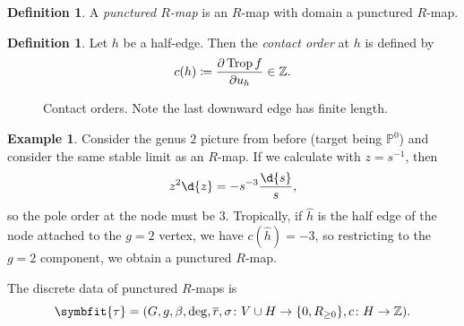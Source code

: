 \documentclass[10pt,oldfontcommands,oneside]{memoir}
\theoremstyle{definition}
\newtheorem{defn}[thm]{Definition}
\newtheorem{exm}[thm]{Example}
\theoremstyle{remark}
\theoremstyle{plain}
\theoremstyle{definition}
\theoremstyle{remark}
\newcommand{\R}{\mathbb{R}}
\newcommand{\Z}{\mathbb{Z}}
\renewcommand{\P}{\mathbb{P}}
\newcommand{\on}[1]{\operatorname{#1}}
\newcommand{\ol}[1]{\overline{#1}}
\newcommand{\1}{\mathbf{1}}
\newcommand{\2}{\mathbf{2}}
\newcommand{\3}{\mathbf{3}}
\begin{document}
\begin{defn}
    A \textit{punctured $R$-map} is an $R$-map with domain a punctured $R$-map.
\end{defn}

\begin{defn}
    Let $h$ be a half-edge. Then the \textit{contact order} at $h$ is defined by
    \[ c(h) \coloneqq \pdv{\on{Trop} f}{u_h} \in \Z. \]
\end{defn}

\begin{figure}[htpb]
    \centering
    \caption{Contact orders. Note the last downward edge has finite length.}
    \label{fig:interval-png}
\end{figure}


\begin{exm}
    Consider the genus $2$ picture from before (target being $\P^0$) and consider the same stable limit as an $R$-map. If we calculate with $z = s^{-1}$, then
    \[ z^2 \d{z} = -s^{-3} \frac{\d{s}}{s}, \]
    so the pole order at the node must be $3$. Tropically, if $\hat{h}$ is the half edge of the node attached to the $g=2$ vertex, we have $c(\hat{h}) = -3$, so restricting to the $g=2$ component, we obtain a punctured $R$-map.
\end{exm}

The discrete data of punctured $R$-maps is
\[ \symbfit{\tau} = (G, g, \beta, \deg, \ol{r}, \sigma\colon V \cup H \to \{0,R_{\geq 0}\}, c \colon H \to \Z). \]
\end{document}
